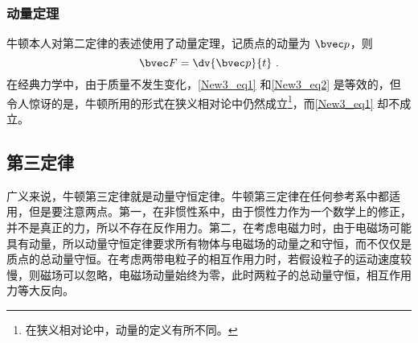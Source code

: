 \subsubsection{动量定理}
牛顿本人对第二定律的表述使用了动量定理，记质点的动量为 $\bvec p$，则
\begin{equation}\label{New3_eq2}
\bvec F = \dv{\bvec p}{t}~.
\end{equation}
在经典力学中，由于质量不发生变化，\autoref{New3_eq1} 和\autoref{New3_eq2} 是等效的，但令人惊讶的是，牛顿所用的形式在狭义相对论中仍然成立\footnote{在狭义相对论中，动量的定义有所不同。}，而\autoref{New3_eq1} 却不成立。

\subsection{第三定律}
广义来说，牛顿第三定律就是动量守恒定律。牛顿第三定律在任何参考系中都适用，但是要注意两点。第一，在非惯性系中，由于惯性力作为一个数学上的修正，并不是真正的力，所以不存在反作用力。第二，在考虑电磁力时，由于电磁场可能具有动量，所以动量守恒定律要求所有物体与电磁场的动量之和守恒，而不仅仅是质点的总动量守恒。在考虑两带电粒子的相互作用力时，若假设粒子的运动速度较慢，则磁场可以忽略，电磁场动量始终为零，此时两粒子的总动量守恒，相互作用力等大反向。
